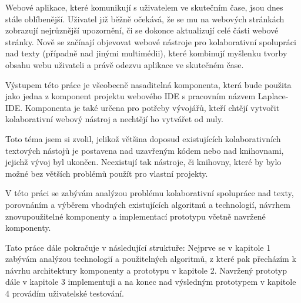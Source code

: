 \begin{introduction}

    Webové aplikace, které komunikují s uživatelem ve skutečním čase, jsou dnes stále oblíbenější.
    Uživatel již běžně očekává, že se mu na webových stránkách zobrazují nejrůznější upozornění, či se dokonce aktualizují celé části webové stránky.
    Nově se začínají objevovat webové nástroje pro kolaborativní spolupráci nad texty (případně nad jinými multimédii), které kombinují myšlenku tvorby obsahu webu uživateli a právě odezvu aplikace ve skutečném čase.

    Výstupem této práce je všeobecně nasaditelná komponenta, která bude použita jako jedna z komponent projektu webového IDE s pracovním názvem Laplace-IDE.
    Komponenta je také určena pro potřeby vývojářů, kteří chtějí vytvořit kolaborativní webový nástroj a nechtějí ho vytvářet od nuly.

    Toto téma jsem si zvolil, jelikož většina doposud existujících kolaborativních textových nástojů je postavena nad uzavřeným kódem nebo nad knihovnami, jejichž vývoj byl ukončen.
    Neexistují tak nástroje, či knihovny, které by bylo možné bez větších problémů použít pro vlastní projekty.

    V této práci se zabývám analýzou problému kolaborativní spolupráce nad texty, porovnáním a výběrem vhodných existujících algoritmů a technologií, návrhem znovupoužitelné komponenty a implementací prototypu včetně navržené komponenty.

    Tato práce dále pokračuje v následující struktuře:
    Nejprve se v kapitole 1 zabývám analýzou technologií a použitelných algoritmů, z které pak přecházím k návrhu architektury komponenty a prototypu v kapitole 2.
    Navržený prototyp dále v kapitole 3 implementuji a na konec nad výsledným prototypem v kapitole 4 provádím uživatelské testování.

\end{introduction}